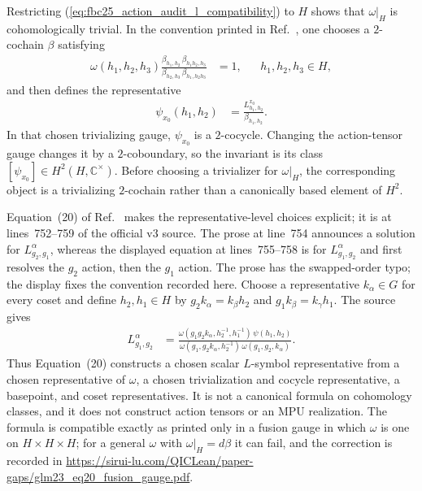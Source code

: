 \documentclass{article}
\begin{document}
Restricting
(\ref{eq:fbc25_action_audit_l_compatibility}) to $H$ shows that
$\omega|_H$ is cohomologically trivial.  In the convention printed in
Ref.~\cite[source lines~740--749]{GarreRubio2023MPOSym}, one chooses a
$2$-cochain $\beta$ satisfying
\begin{align}
    \omega(h_1,h_2,h_3)
    \frac{\beta_{h_1,h_2}\,\beta_{h_1h_2,h_3}}
         {\beta_{h_2,h_3}\,\beta_{h_1,h_2h_3}}
        &=1,
        &&h_1,h_2,h_3\in H,
    \label{eq:fbc25_action_audit_restricted_trivialization}
\end{align}
and then defines the representative
\begin{align}
    \psi_{x_0}(h_1,h_2)
        &=\frac{L^{x_0}_{h_1,h_2}}{\beta_{h_1,h_2}}.
    \label{eq:fbc25_action_audit_psi_representative}
\end{align}
In that chosen trivializing gauge, $\psi_{x_0}$ is a $2$-cocycle.  Changing
the action-tensor gauge changes it by a $2$-coboundary, so the invariant is its
class $[\psi_{x_0}]\in H^2(H,\mathbb C^\times)$.  Before choosing a
trivializer for $\omega|_H$, the corresponding object is a trivializing
$2$-cochain rather than a canonically based element of $H^2$.

Equation~(20) of Ref.~\cite{GarreRubio2023MPOSym} makes the
representative-level choices explicit; it is at lines~752--759 of the
official v3 source.  The prose at line~754 announces a solution for
$L^\alpha_{g_2,g_1}$, whereas the displayed equation at lines~755--758 is for
$L^\alpha_{g_1,g_2}$ and first resolves the $g_2$ action, then the $g_1$
action.  The prose has the swapped-order typo; the display fixes the convention
recorded here.  Choose a representative
$k_\alpha\in G$ for every coset and define $h_2,h_1\in H$ by
$g_2k_\alpha=k_\beta h_2$ and
$g_1k_\beta=k_\gamma h_1$.  The source gives
\begin{align}
    L^\alpha_{g_1,g_2}
        &=\frac{
          \omega(g_1g_2k_\alpha,h_2^{-1},h_1^{-1})\,
          \psi(h_1,h_2)}{
          \omega(g_1,g_2k_\alpha,h_2^{-1})\,
          \omega(g_1,g_2,k_\alpha)}.
    \label{eq:fbc25_action_audit_l_reconstruction}
\end{align}
Thus Equation~(20) constructs a chosen scalar $L$-symbol representative from
a chosen representative of $\omega$, a chosen trivialization and cocycle
representative, a basepoint, and coset representatives.  It is not a canonical
formula on cohomology classes, and it does not construct action tensors or an
MPU realization.  The formula is compatible exactly as printed only in a
fusion gauge in which $\omega$ is one on $H\times H\times H$; for a general
$\omega$ with $\omega|_H=d\beta$ it can fail, and the correction is recorded
in \url{https://sirui-lu.com/QICLean/paper-gaps/glm23_eq20_fusion_gauge.pdf}.
\end{document}
